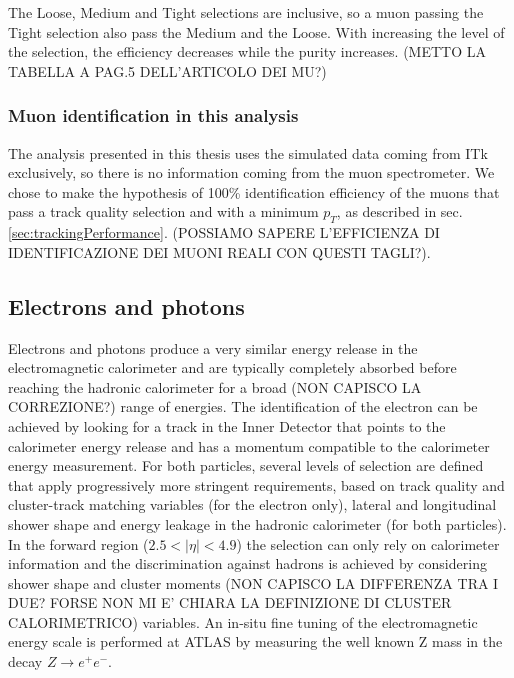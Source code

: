 \documentclass[a4paper,twoside,12pt]{article}
\begin{document}
The Loose, Medium and Tight selections are inclusive, so a muon passing the Tight selection also pass the Medium and the Loose. With increasing the level of the selection, the efficiency decreases
while the purity increases. (METTO LA TABELLA A PAG.5 DELL'ARTICOLO DEI MU?)

\subsubsection*{Muon identification in this analysis}
The analysis presented in this thesis uses the simulated data coming from ITk exclusively, so there is no information coming from the muon spectrometer. We chose to make the hypothesis of 100\% identification efficiency of the muons that pass a track quality selection and with a minimum $p_{T}$, as described in sec.\ref{sec:trackingPerformance}. (POSSIAMO SAPERE L'EFFICIENZA DI IDENTIFICAZIONE DEI MUONI REALI CON QUESTI TAGLI?). 

\subsection{Electrons and photons}
Electrons and photons produce a very similar energy release in the electromagnetic calorimeter and are typically completely absorbed before reaching the hadronic calorimeter for a broad (NON CAPISCO LA CORREZIONE?) range of energies. The identification of the
electron can be achieved by 
looking for a track in the Inner Detector that points to the calorimeter energy release and has a momentum compatible to the calorimeter energy measurement. For both particles, several levels of selection are defined that apply progressively
more stringent requirements, based on track quality and cluster-track matching variables (for the electron only), lateral and longitudinal shower shape and energy leakage in the 
hadronic calorimeter (for both particles). In the forward region ($2.5 < |\eta| < 4.9$) the 
selection can only rely on calorimeter information and the discrimination against hadrons
is achieved by considering shower shape and cluster moments (NON CAPISCO LA DIFFERENZA TRA I DUE? FORSE NON MI E' CHIARA LA DEFINIZIONE DI CLUSTER CALORIMETRICO) variables. An in-situ fine tuning
of the electromagnetic energy scale is performed at ATLAS by measuring the well known 
Z mass in the decay $Z \rightarrow e^+e^-$.
\end{document}
